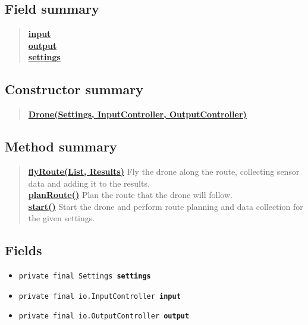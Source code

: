 \documentclass[11pt,a4paper]{report}
\begin{document}
{{{{\subsection{Field summary}{
\begin{verse}
\hyperlink{uk.ac.ed.inf.aqmaps.Drone.input}{{\bf input}} \\
\hyperlink{uk.ac.ed.inf.aqmaps.Drone.output}{{\bf output}} \\
\hyperlink{uk.ac.ed.inf.aqmaps.Drone.settings}{{\bf settings}} \\
\end{verse}
}
\subsection{Constructor summary}{
\begin{verse}
\hyperlink{uk.ac.ed.inf.aqmaps.Drone(uk.ac.ed.inf.aqmaps.Settings, uk.ac.ed.inf.aqmaps.io.InputController, uk.ac.ed.inf.aqmaps.io.OutputController)}{{\bf Drone(Settings, InputController, OutputController)}} \\
\end{verse}
}
\subsection{Method summary}{
\begin{verse}
\hyperlink{uk.ac.ed.inf.aqmaps.Drone.flyRoute(java.util.List, uk.ac.ed.inf.aqmaps.Results)}{{\bf flyRoute(List, Results)}} Fly the drone along the route, collecting sensor data and adding it to the results.\\
\hyperlink{uk.ac.ed.inf.aqmaps.Drone.planRoute()}{{\bf planRoute()}} Plan the route that the drone will follow.\\
\hyperlink{uk.ac.ed.inf.aqmaps.Drone.start()}{{\bf start()}} Start the drone and perform route planning and data collection for the given settings.\\
\end{verse}
}
\subsection{Fields}{
\begin{itemize}
\item{
\label{uk.ac.ed.inf.aqmaps.Drone.settings}\hypertarget{uk.ac.ed.inf.aqmaps.Drone.settings}{\texttt{private final Settings\ {\bf  settings}}
}
}
\item{
\label{uk.ac.ed.inf.aqmaps.Drone.input}\hypertarget{uk.ac.ed.inf.aqmaps.Drone.input}{\texttt{private final io.InputController\ {\bf  input}}
}
}
\item{
\label{uk.ac.ed.inf.aqmaps.Drone.output}\hypertarget{uk.ac.ed.inf.aqmaps.Drone.output}{\texttt{private final io.OutputController\ {\bf  output}}
}
}
\end{itemize}
}
}}}}
\end{document}
